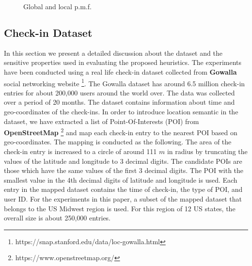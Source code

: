 \begin{figure*}[t]
    \begin{center}
        \caption{Global and local p.m.f.}
\label{fig:pmf}        
       \end{center}         
\end{figure*} 



\subsection{Check-in Dataset}
In this section we present a detailed discussion about the dataset and the sensitive properties used in evaluating the proposed heuristics. The experiments have been conducted using a  real life check-in dataset collected from \textbf{Gowalla} social networking website \footnote{https://snap.stanford.edu/data/loc-gowalla.html}. The Gowalla dataset has around 6.5 million check-in entries for about 200,000 users around the world over. The data was collected over a period of 20 months. The dataset contains information about time and geo-coordinates of the check-ins. In order to introduce location semantic in the dataset, we have extracted a list of Point-Of-Interests (POI) from \textbf{OpenStreetMap} \footnote{https://www.openstreetmap.org/} and map each check-in entry to the nearest POI based on geo-coordinates. The mapping is conducted as the following. The area of the check-in entry is increased to a circle of around 111 $m$ in radius by truncating the values of the latitude and longitude to 3 decimal digits. The candidate POIs are those which have the same values of the first 3 decimal digits. The POI with the smallest value in the 4th decimal digits of latitude and longitude is used. Each entry in the mapped dataset contains the time of check-in, the type of POI, and user ID. For the experiments in this paper, a subset of the mapped dataset that belongs to the US Midwest region is used. For this region of 12 US states, the overall size is about 250,000 entries.

